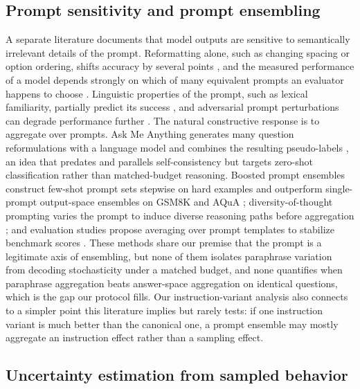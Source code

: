 \subsection{Prompt sensitivity and prompt ensembling}

A separate literature documents that model outputs are sensitive to semantically irrelevant details of the prompt. Reformatting alone, such as changing spacing or option ordering, shifts accuracy by several points \citep{sclar2024quantifying}, and the measured performance of a model depends strongly on which of many equivalent prompts an evaluator happens to choose \citep{mizrahi2024state}. Linguistic properties of the prompt, such as lexical familiarity, partially predict its success \citep{leidinger2023language}, and adversarial prompt perturbations can degrade performance further \citep{zhu2023promptbench}. The natural constructive response is to aggregate over prompts. Ask Me Anything generates many question reformulations with a language model and combines the resulting pseudo-labels \citep{arora2023ask}, an idea that predates and parallels self-consistency but targets zero-shot classification rather than matched-budget reasoning. Boosted prompt ensembles construct few-shot prompt sets stepwise on hard examples and outperform single-prompt output-space ensembles on GSM8K and AQuA \citep{pitis2023boosted}; diversity-of-thought prompting varies the prompt to induce diverse reasoning paths before aggregation \citep{naik2023diversity}; and evaluation studies propose averaging over prompt templates to stabilize benchmark scores \citep{mizrahi2024state}. These methods share our premise that the prompt is a legitimate axis of ensembling, but none of them isolates paraphrase variation from decoding stochasticity under a matched budget, and none quantifies when paraphrase aggregation beats answer-space aggregation on identical questions, which is the gap our protocol fills. Our instruction-variant analysis also connects to a simpler point this literature implies but rarely tests: if one instruction variant is much better than the canonical one, a prompt ensemble may mostly aggregate an instruction effect rather than a sampling effect.

\subsection{Uncertainty estimation from sampled behavior}


